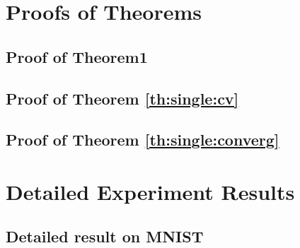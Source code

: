 \chapter{Proofs of Theorems}
\section{Proof of Theorem1}

\section{Proof of Theorem \ref{th:single:cv}}\label{app:cross}

\section{Proof of Theorem \ref{th:single:converg}}\label{app:converg}

%
%
\chapter{Detailed Experiment Results}
\section{Detailed result on MNIST}
